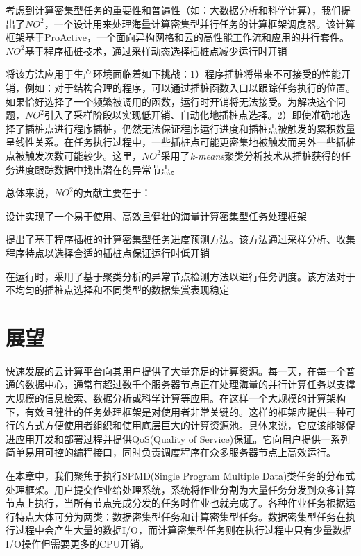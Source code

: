 考虑到计算密集型任务的重要性和普遍性（如：大数据分析和科学计算），我们提出了$NO^2$，一个设计用来处理海量计算密集型并行任务的计算框架调度器。该计算框架基于ProActive，一个面向异构网格和云的高性能工作流和应用的并行套件。$NO^2$基于程序插桩技术，通过采样动态选择插桩点减少运行时开销

将该方法应用于生产环境面临着如下挑战：1）程序插桩将带来不可接受的性能开销，例如：对于结构合理的程序，可以通过插桩函数入口以跟踪任务执行的位置。如果恰好选择了一个频繁被调用的函数，运行时开销将无法接受。为解决这个问题，$NO^2$引入了采样阶段以实现低开销、自动化地插桩点选择。2）即使准确地选择了插桩点进行程序插桩，仍然无法保证程序运行进度和插桩点被触发的累积数量呈线性关系。在任务执行过程中，一些插桩点可能更密集地被触发而另外一些插桩点被触发次数可能较少。这里，$NO^2$采用了\emph{k-means}聚类分析技术从插桩获得的任务进度跟踪数据中找出潜在的异常节点。

总体来说，$NO^2$的贡献主要在于：

设计实现了一个易于使用、高效且健壮的海量计算密集型任务处理框架

提出了基于程序插桩的计算密集型任务进度预测方法。该方法通过采样分析、收集程序特点以选择合适的插桩点保证运行时低开销

在运行时，采用了基于聚类分析的异常节点检测方法以进行任务调度。该方法对于不均匀的插桩点选择和不同类型的数据集赏表现稳定

\section{展望}
\label{sec:conclusion}
快速发展的云计算平台向其用户提供了大量充足的计算资源。每一天，在每一个普通的数据中心，通常有超过数千个服务器节点正在处理海量的并行计算任务以支撑大规模的信息检索、数据分析或科学计算等应用。在这样一个大规模的计算架构下，有效且健壮的任务处理框架是对使用者非常关键的。这样的框架应提供一种可行的方式方便使用者组织和使用底层巨大的计算资源池。具体来说，它应该能够促进应用开发和部署过程并提供QoS(Quality of Service)保证。它向用户提供一系列简单易用可控的编程接口，同时负责调度程序在众多服务器节点上高效运行。

在本章中，我们聚焦于执行SPMD(Single Program Multiple Data)类任务的分布式处理框架。用户提交作业给处理系统，系统将作业分割为大量任务分发到众多计算节点上执行，当所有节点完成分发的任务时作业也就完成了。各种作业任务根据运行特点大体可分为两类：数据密集型任务和计算密集型任务。数据密集型任务在执行过程中会产生大量的数据I/O，而计算密集型任务则在执行过程中只有少量数据I/O操作但需要更多的CPU开销。
